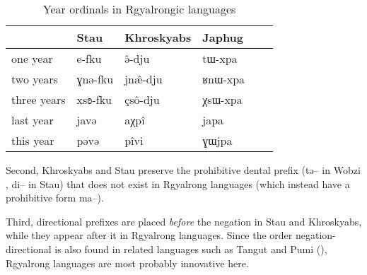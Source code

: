 \documentclass[oneside,a4paper,11pt]{article}
\newcommand{\ipa}[1]{{\phon #1}} %
\begin{document}
  \begin{table}[h]
  \caption{Year ordinals in Rgyalrongic languages} \label{tab:year} \centering
 \begin{tabular}{llllll}
 \toprule
 & 	Stau & 	Khroskyabs & 	Japhug & 	\\	
 \midrule
one year & 	\ipa{e-fku} & 	\ipa{ə̂-dju } & 	\ipa{tɯ-xpa} & 	\\	
two years & 	\ipa{ɣnə-fku} & 	\ipa{jnæ̂-dju } & 	\ipa{ʁnɯ-xpa} & 	\\	
three years & 	\ipa{xsʚ-fku} & 	\ipa{çsô-dju } & 	\ipa{χsɯ-xpa} & 	\\	
 \midrule
last year & 	\ipa{javə} & 	\ipa{aχpî} & 	\ipa{japa} & 	\\	
this year & 	\ipa{pəvə} & 	\ipa{pîvi} & 	\ipa{ɣɯjpa} & 	\\	
\bottomrule
\end{tabular}
\end{table}


Second, Khroskyabs and Stau preserve the prohibitive dental prefix (\ipa{tə--} in Wobzi \citealt[130-1]{lai13affixale}, \ipa{di--} in Stau) that does not exist in Rgyalrong languages (which instead have a prohibitive form \ipa{ma--}).

Third, directional prefixes are placed \textit{before} the negation in Stau and Khroskyabs, while they appear after it in Rgyalrong languages. Since the order negation-directional is also found in related languages such as Tangut and Pumi (\citealt{jacques11tangut.verb}), Rgyalrong languages are most probably innovative here.



\end{document}
